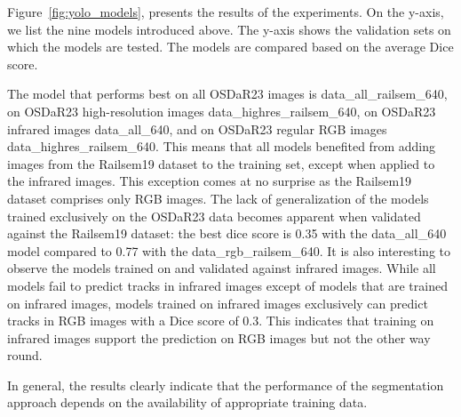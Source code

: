 \documentclass[Master,MDS,english]{BASE/twbook} %
\begin{document}
Figure~\ref{fig:yolo_models}, presents the results of the experiments. On the y-axis, we list the nine models introduced above. The y-axis shows the validation sets on which the models are tested. The models are compared based on the average Dice score.

 The model that performs best on all OSDaR23 images is data\_all\_railsem\_640, on OSDaR23 high-resolution images data\_highres\_railsem\_640, on OSDaR23 infrared images data\_all\_640, and on OSDaR23 regular RGB images data\_highres\_railsem\_640. This means that all models benefited from adding images from the Railsem19 dataset to the training set, except when applied to the infrared images. This exception comes at no surprise as the Railsem19 dataset comprises only RGB images.
 The lack of generalization of the models trained exclusively on the OSDaR23 data becomes apparent when validated against the Railsem19 dataset: the best dice score is 0.35 with the data\_all\_640 model compared to 0.77 with the data\_rgb\_railsem\_640.
It is also interesting to observe the models trained on and validated against infrared images. While all models fail to predict tracks in infrared images except of models that are trained on infrared images, models trained on infrared images exclusively can predict tracks in RGB images with a Dice score of 0.3. This indicates that training on infrared images support the prediction on RGB images but not the other way round. 

In general, the results clearly indicate that the performance of the segmentation approach depends on the availability of appropriate training data. 


 
\end{document}
